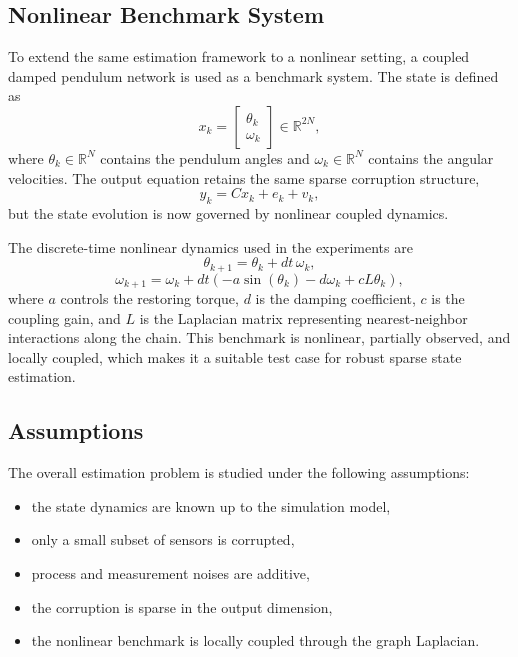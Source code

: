 \documentclass[conference]{IEEEtran}
\begin{document}
\subsection{Nonlinear Benchmark System}

To extend the same estimation framework to a nonlinear setting, a coupled damped pendulum network is used as a benchmark system. The state is defined as
\begin{equation}
x_k =
\begin{bmatrix}
\theta_k \\
\omega_k
\end{bmatrix}
\in \mathbb{R}^{2N},
\end{equation}
where $\theta_k \in \mathbb{R}^{N}$ contains the pendulum angles and $\omega_k \in \mathbb{R}^{N}$ contains the angular velocities. The output equation retains the same sparse corruption structure,
\begin{equation}
y_k = Cx_k + e_k + v_k,
\end{equation}
but the state evolution is now governed by nonlinear coupled dynamics. \cite{nonlinearModel}

The discrete-time nonlinear dynamics used in the experiments are
\begin{equation}
\theta_{k+1} = \theta_k + dt\,\omega_k,
\end{equation}
\begin{equation}
\omega_{k+1} = \omega_k + dt\left(-a\sin(\theta_k) - d\omega_k + cL\theta_k\right),
\end{equation}
where $a$ controls the restoring torque, $d$ is the damping coefficient, $c$ is the coupling gain, and $L$ is the Laplacian matrix representing nearest-neighbor interactions along the chain. This benchmark is nonlinear, partially observed, and locally coupled, which makes it a suitable test case for robust sparse state estimation. \cite{nonlinearModel}

\subsection{Assumptions}

The overall estimation problem is studied under the following assumptions:
\begin{itemize}
    \item the state dynamics are known up to the simulation model,
    \item only a small subset of sensors is corrupted,
    \item process and measurement noises are additive,
    \item the corruption is sparse in the output dimension,
    \item the nonlinear benchmark is locally coupled through the graph Laplacian.
\end{itemize}
\end{document}
